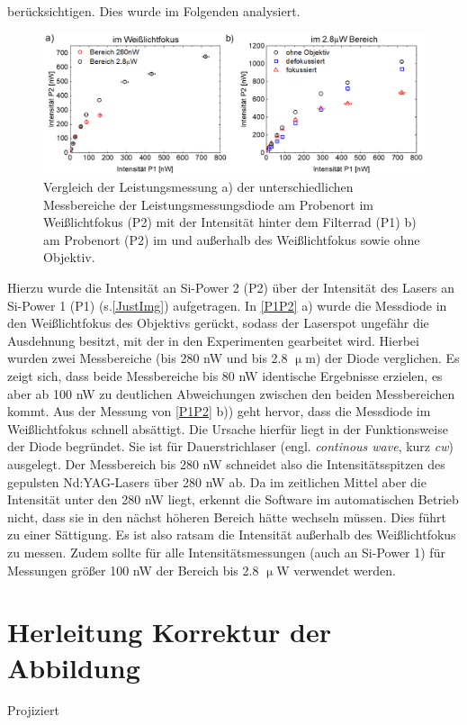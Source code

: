 berücksichtigen. Dies wurde im Folgenden analysiert. \begin{figure}[b]
\centering \includegraphics[width=1\textwidth]{Bilder/Anhang/Bereichsvergleich}
\caption[Vergleich Leistungsmessung]{Vergleich der Leistungsmessung a) der
unterschiedlichen Messbereiche der Leistungsmessungsdiode am Probenort im
Weißlichtfokus (P2) mit der Intensität hinter dem Filterrad (P1) b) am Probenort
(P2) im und außerhalb des Weißlichtfokus sowie ohne Objektiv.} \label{P1P2}
\end{figure} Hierzu wurde die Intensität an Si-Power 2 (P2) über der Intensität
des Lasers an Si-Power 1 (P1) (s.\autoref{JustImg}) aufgetragen. In
\autoref{P1P2} a) wurde die Messdiode in den Weißlichtfokus des Objektivs
gerückt, sodass der Laserspot ungefähr die Ausdehnung besitzt, mit der in den
Experimenten gearbeitet wird. Hierbei wurden zwei Messbereiche (bis 280 nW und
bis 2.8 $\upmu$m) der Diode verglichen. Es zeigt sich, dass beide Messbereiche
bis 80 nW identische Ergebnisse erzielen, es aber ab 100 nW zu deutlichen
Abweichungen zwischen den beiden Messbereichen kommt. Aus der Messung von
\autoref{P1P2} b)) geht hervor, dass die Messdiode im Weißlichtfokus schnell
absättigt. Die Ursache hierfür liegt in der Funktionsweise der Diode begründet.
Sie ist für Dauerstrichlaser (engl. \textit{continous wave}, kurz \textit{cw})
ausgelegt. Der Messbereich bis 280 nW schneidet also die Intensitätsspitzen des
gepulsten Nd:YAG-Lasers über 280 nW ab. Da im zeitlichen Mittel aber die
Intensität unter den 280 nW liegt, erkennt die Software im automatischen Betrieb
nicht, dass sie in den nächst höheren Bereich hätte wechseln müssen. Dies führt
zu einer Sättigung. Es ist also ratsam die Intensität außerhalb des
Weißlichtfokus zu messen. Zudem sollte für alle Intensitätsmessungen (auch an
Si-Power 1) für Messungen größer 100 nW der Bereich bis 2.8 $\upmu$W verwendet
werden. \section{Herleitung Korrektur der Abbildung} \label{correct} Projiziert
